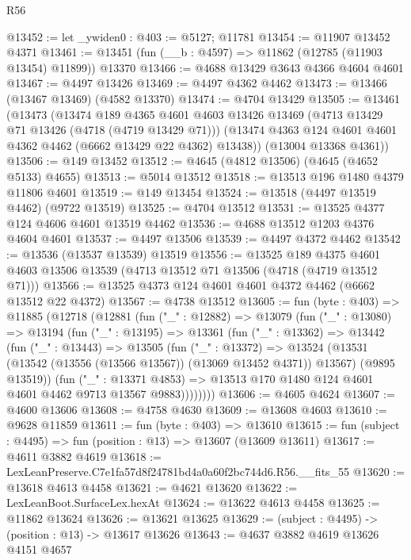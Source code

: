 \begin{lexlean}{R56}
\begin{coremodule}
@13452 := let _ywiden0 : @403 := @5127; @11781
@13454 := @11907 @13452 @4371
@13461 := @13451 (fun (__b : @4597) => @11862 (@12785 (@11903 @13454) @11899)) @13370
@13466 := @4688 @13429 @3643 @4366 @4604 @4601
@13467 := @4497 @13426
@13469 := @4497 @4362 @4462
@13473 := @13466 (@13467 @13469) (@4582 @13370)
@13474 := @4704 @13429
@13505 := @13461
    (@13473
      (@13474
        @189
        @4365
        @4601
        @4603
        @13426
        @13469
        (@4713 @13429 @71 @13426 (@4718 (@4719 @13429 @71)))
        (@13474 @4363 @124 @4601 @4601 @4362 @4462 (@6662 @13429 @22 @4362) @13438))
      (@13004 @13368 @4361))
@13506 := @149 @13452
@13512 := @4645 (@4812 @13506) (@4645 (@4652 @5133) @4655)
@13513 := @5014 @13512
@13518 := @13513 @196 @1480 @4379 @11806 @4601
@13519 := @149 @13454
@13524 := @13518 (@4497 @13519 @4462) (@9722 @13519)
@13525 := @4704 @13512
@13531 := @13525 @4377 @124 @4606 @4601 @13519 @4462
@13536 := @4688 @13512 @1203 @4376 @4604 @4601
@13537 := @4497 @13506
@13539 := @4497 @4372 @4462
@13542 := @13536 (@13537 @13539) @13519
@13556 := @13525
    @189
    @4375
    @4601
    @4603
    @13506
    @13539
    (@4713 @13512 @71 @13506 (@4718 (@4719 @13512 @71)))
@13566 := @13525 @4373 @124 @4601 @4601 @4372 @4462 (@6662 @13512 @22 @4372)
@13567 := @4738 @13512
@13605 := fun (byte : @403) =>
  @11885
    (@12718
      (@12881
        (fun ("_" : @12882) =>
        @13079
          (fun ("_" : @13080) =>
          @13194
            (fun ("_" : @13195) =>
            @13361
              (fun ("_" : @13362) =>
              @13442
                (fun ("_" : @13443) =>
                @13505
                  (fun ("_" : @13372) =>
                  @13524
                    (@13531 (@13542 (@13556 (@13566 @13567)) (@13069 @13452 @4371)) @13567)
                    (@9895 @13519))
                  (fun ("_" : @13371 @4853) =>
                  @13513 @170 @1480 @124 @4601 @4601 @4462 @9713 @13567 @9883))))))))
@13606 := @4605 @4624
@13607 := @4600 @13606
@13608 := @4758 @4630
@13609 := @13608 @4603
@13610 := @9628 @11859
@13611 := fun (byte : @403) => @13610
@13615 := fun (subject : @4495) => fun (position : @13) => @13607 (@13609 @13611)
@13617 := @4611 @3882 @4619
@13618 := LexLeanPreserve.C7e1fa57d8f24781bd4a0a60f2bc744d6.R56.__fits_55
@13620 := @13618 @4613 @4458
@13621 := @4621 @13620
@13622 := LexLeanBoot.SurfaceLex.hexAt
@13624 := @13622 @4613 @4458
@13625 := @11862 @13624
@13626 := @13621 @13625
@13629 := (subject : @4495) -> (position : @13) -> @13617 @13626
@13643 := @4637
    @3882
    @4619
    @13626
    @4151
    @4657

\end{coremodule}
\end{lexlean}
